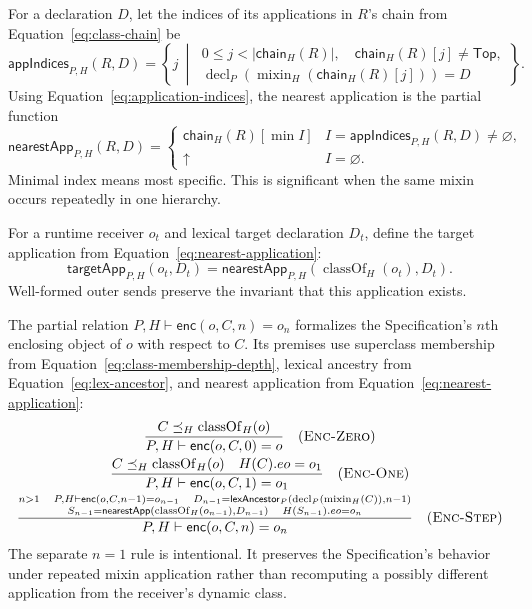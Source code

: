 \documentclass[11pt]{article}
\numberwithin{equation}{section}
\newcommand{\kw}[1]{\ensuremath{\mathsf{#1}}}
\newcommand{\undef}{\mathord{\uparrow}}
\newcommand{\Top}{\kw{Top}}
\newcommand{\classof}{\mathop{\mathrm{classOf}}}
\newcommand{\mixin}{\mathop{\mathrm{mixin}}}
\newcommand{\decl}{\mathop{\mathrm{decl}}}
\newcommand{\rulelabel}[1]{\textsc{#1}}
\begin{document}
For a declaration $D$, let the indices of its applications in $R$'s chain
from Equation~\eqref{eq:class-chain} be
\begin{equation}\label{eq:application-indices}
 \mathsf{appIndices}_{P,H}(R,D)=
 \left\{j\ \middle|\
 \begin{array}{l}
 0\le j<|\mathsf{chain}_H(R)|,\quad
 \mathsf{chain}_H(R)[j]\ne\Top,\\
 \decl_P(\mixin_H(\mathsf{chain}_H(R)[j]))=D
 \end{array}\right\}.
\end{equation}
Using Equation~\eqref{eq:application-indices}, the nearest application is the
partial function
\begin{equation}\label{eq:nearest-application}
 \mathsf{nearestApp}_{P,H}(R,D)=
 \begin{cases}
  \mathsf{chain}_H(R)[\min I]
    & I=\mathsf{appIndices}_{P,H}(R,D)\ne\varnothing,\\
  \undef & I=\varnothing.
 \end{cases}
\end{equation}
Minimal index means most specific.  This is significant when the same mixin
occurs repeatedly in one hierarchy.

For a runtime receiver $o_t$ and lexical target declaration $D_t$, define the
target application from Equation~\eqref{eq:nearest-application}:
\begin{equation}\label{eq:target-application}
  \mathsf{targetApp}_{P,H}(o_t,D_t)
    =\mathsf{nearestApp}_{P,H}(\classof_H(o_t),D_t).
\end{equation}
Well-formed outer sends preserve the invariant that this application exists.

The partial relation
$P,H\vdash \mathsf{enc}(o,C,n)=o_n$ formalizes the Specification's $n$th
enclosing object of $o$ with respect to $C$.  Its premises use superclass
membership from Equation~\eqref{eq:class-membership-depth}, lexical ancestry
from Equation~\eqref{eq:lex-ancestor}, and nearest application from
Equation~\eqref{eq:nearest-application}:
\[
\begin{array}{c}
\dfrac{C\preceq_H\classof_H(o)}
      {P,H\vdash\mathsf{enc}(o,C,0)=o}
\quad(\rulelabel{Enc-Zero})\\[2ex]
\dfrac{C\preceq_H\classof_H(o)\quad H(C).eo=o_1}
      {P,H\vdash\mathsf{enc}(o,C,1)=o_1}
\quad(\rulelabel{Enc-One})\\[2ex]
\dfrac{\substack{n>1\quad P,H\vdash\mathsf{enc}(o,C,n-1)=o_{n-1}\quad
       D_{n-1}=\mathsf{lexAncestor}_P(\decl_P(\mixin_H(C)),n-1)\\
       S_{n-1}=\mathsf{nearestApp}(\classof_H(o_{n-1}),D_{n-1})\quad
       H(S_{n-1}).eo=o_n}}
      {P,H\vdash\mathsf{enc}(o,C,n)=o_n}
\quad(\rulelabel{Enc-Step})
\end{array}
\]
The separate $n=1$ rule is intentional.  It preserves the Specification's
behavior under repeated mixin application rather than recomputing a possibly
different application from the receiver's dynamic class.
\end{document}
